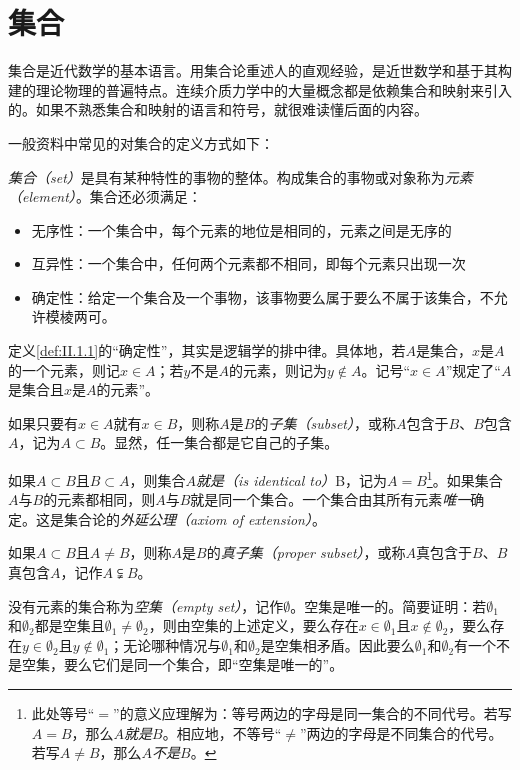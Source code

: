 \documentclass[../main.tex]{subfiles}
\begin{document}
\section{集合}
集合是近代数学的基本语言。用集合论重述人的直观经验，是近世数学和基于其构建的理论物理的普遍特点。连续介质力学中的大量概念都是依赖集合和映射来引入的。如果不熟悉集合和映射的语言和符号，就很难读懂后面的内容。

一般资料中常见的对集合的定义方式如下：

\begin{definition}\label{def:II.1.1}
    \emph{集合（set）}是具有某种特性的事物的整体。构成集合的事物或对象称为\emph{元素（element）}。集合还必须满足：
    \begin{itemize}
        \item 无序性：一个集合中，每个元素的地位是相同的，元素之间是无序的
        \item 互异性：一个集合中，任何两个元素都不相同，即每个元素只出现一次
        \item 确定性：给定一个集合及一个事物，该事物要么属于要么不属于该集合，不允许模棱两可。
    \end{itemize}
\end{definition}

定义\ref{def:II.1.1}的“确定性”，其实是逻辑学的排中律。具体地，若$A$是集合，$x$是$A$的一个元素，则记$x\in A$；若$y$不是$A$的元素，则记为$y\notin A$。记号“$x\in A$”规定了“$A$是集合且$x$是$A$的元素”。

如果只要有$x\in A$就有$x\in B$，则称$A$是$B$的\emph{子集（subset）}，或称$A$包含于$B$、$B$包含$A$，记为$A\subset B$。显然，任一集合都是它自己的子集。

如果$A\subset B$且$B\subset A$，则集合$A$\emph{就是（is identical to）}B，记为$A=B$\footnote{此处等号“$=$”的意义应理解为：等号两边的字母是同一集合的不同代号。若写$A=B$，那么$A$\emph{就是}$B$。相应地，不等号“$\neq$”两边的字母是不同集合的代号。若写$A\neq B$，那么$A$\emph{不是}$B$。}。如果集合$A$与$B$的元素都相同，则$A$与$B$就是同一个集合。一个集合由其所有元素\emph{唯一}确定。这是集合论的\emph{外延公理（axiom of extension）}。

如果$A\subset B$且$A\neq B$，则称$A$是$B$的\emph{真子集（proper subset）}，或称$A$真包含于$B$、$B$真包含$A$，记作$A\subsetneqq B$。

没有元素的集合称为\emph{空集（empty set）}，记作$\emptyset$。空集是唯一的。简要证明：若$\emptyset_1$和$\emptyset_2$都是空集且$\emptyset_1\neq\emptyset_2$，则由空集的上述定义，要么存在$x\in\emptyset_1$且$x\notin\emptyset_2$，要么存在$y\in\emptyset_2$且$y\notin\emptyset_1$；无论哪种情况与$\emptyset_1$和$\emptyset_2$是空集相矛盾。因此要么$\emptyset_1$和$\emptyset_2$有一个不是空集，要么它们是同一个集合，即“空集是唯一的”。
\end{document}

